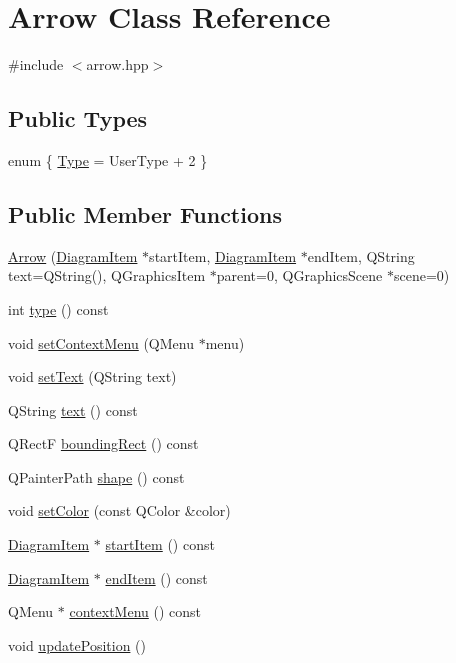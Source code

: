 \hypertarget{class_arrow}{
\section{Arrow Class Reference}
\label{class_arrow}
}


{\ttfamily \#include $<$arrow.hpp$>$}

\subsection*{Public Types}
\begin{DoxyCompactItemize}
\item 
enum \{ \hyperlink{class_arrow_a38fd80d2881b5bb1668ffe6749dfc8a5a36846849919f8bcb37b0c5faf2ca9929}{Type} =  UserType + 2
 \}
\end{DoxyCompactItemize}
\subsection*{Public Member Functions}
\begin{DoxyCompactItemize}
\item 
\hyperlink{class_arrow_a45fcbf0a667ab025d47ac0863fed5818}{Arrow} (\hyperlink{class_diagram_item}{DiagramItem} $\ast$startItem, \hyperlink{class_diagram_item}{DiagramItem} $\ast$endItem, QString text=QString(), QGraphicsItem $\ast$parent=0, QGraphicsScene $\ast$scene=0)
\item 
int \hyperlink{class_arrow_aef6cfdb5dda88ef43c16b34cbd6a0b6f}{type} () const 
\item 
void \hyperlink{class_arrow_aacc85b1893fa0f1379e41afc0ebcd4b0}{setContextMenu} (QMenu $\ast$menu)
\item 
void \hyperlink{class_arrow_a296feb427424b0f4bdc1111cdaf1b5ca}{setText} (QString text)
\item 
QString \hyperlink{class_arrow_affe6fbde77a7c8a1e9fab90a6e8dc092}{text} () const 
\item 
QRectF \hyperlink{class_arrow_a3b15a4c7ab51e17ade465cb928ff5749}{boundingRect} () const 
\item 
QPainterPath \hyperlink{class_arrow_aa51a558d21cfb6bb57578b9e6a745cf3}{shape} () const 
\item 
void \hyperlink{class_arrow_ab7e7333a213b0eb310496b6f815e1824}{setColor} (const QColor \&color)
\item 
\hyperlink{class_diagram_item}{DiagramItem} $\ast$ \hyperlink{class_arrow_aca1c4bf8681a1449b8e09af3dac9b797}{startItem} () const 
\item 
\hyperlink{class_diagram_item}{DiagramItem} $\ast$ \hyperlink{class_arrow_a363d170cfcc7db0472843a93de7e86d4}{endItem} () const 
\item 
QMenu $\ast$ \hyperlink{class_arrow_a2b3688ecfc7d32e5b9f5eb80b1dfb79f}{contextMenu} () const 
\item 
void \hyperlink{class_arrow_a2c78180ebf1b7d26cd52ce630ad9f2ac}{updatePosition} ()
\end{DoxyCompactItemize}
